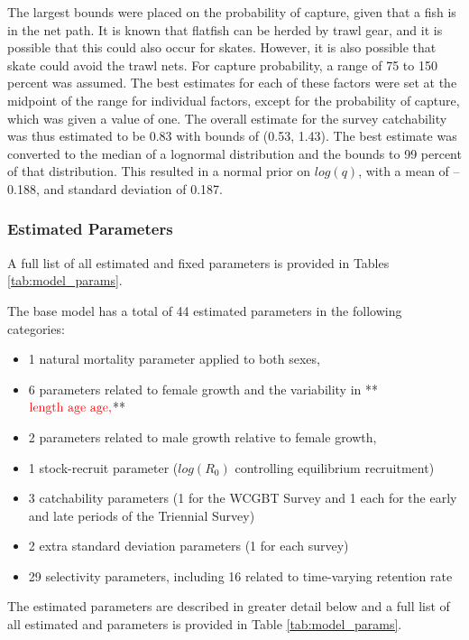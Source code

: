 \documentclass[12pt,]{article}
\begin{document}
The largest bounds were placed on the probability of capture, given that
a fish is in the net path. It is known that flatfish can be herded by
trawl gear, and it is possible that this could also occur for skates.
However, it is also possible that skate could avoid the trawl nets. For
capture probability, a range of 75 to 150 percent was assumed. The best
estimates for each of these factors were set at the midpoint of the
range for individual factors, except for the probability of capture,
which was given a value of one. The overall estimate for the survey
catchability was thus estimated to be 0.83 with bounds of (0.53, 1.43).
The best estimate was converted to the median of a lognormal
distribution and the bounds to 99 percent of that distribution. This
resulted in a normal prior on \(log(q)\), with a mean of --0.188, and
standard deviation of 0.187.

\hypertarget{estimated-parameters}{%
\subsubsection{Estimated Parameters}\label{estimated-parameters}}

A full list of all estimated and fixed parameters is provided in Tables
\ref{tab:model_params}.

The base model has a total of 44 estimated parameters in the following
categories:

\begin{itemize}
  \item 1 natural mortality parameter applied to both sexes,
  \item 6 parameters related to female growth and the variability in **$\color{red}{\text{length age age,}}$**
  \item 2 parameters related to male growth relative to female growth,
  \item 1 stock-recruit parameter ($log(R_0)$ controlling equilibrium recruitment)
  \item 3 catchability parameters (1 for the WCGBT Survey and 1 each for the early and late periods of the Triennial Survey)
  \item 2 extra standard deviation parameters (1 for each survey)
  \item 29 selectivity parameters, including 16 related to time-varying retention rate
\end{itemize}

The estimated parameters are described in greater detail below and a
full list of all estimated and parameters is provided in Table
\ref{tab:model_params}.
\end{document}
